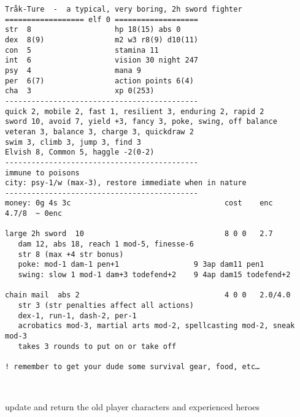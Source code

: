\small \begin{verbatim}
Tråk-Ture  -  a typical, very boring, 2h sword fighter
================== elf 0 ===================
str  8                   hp 18(15) abs 0
dex  8(9)                m2 w3 r8(9) d10(11)
con  5                   stamina 11
int  6                   vision 30 night 247
psy  4                   mana 9
per  6(7)                action points 6(4)
cha  3                   xp 0(253)
--------------------------------------------
quick 2, mobile 2, fast 1, resilient 3, enduring 2, rapid 2
sword 10, avoid 7, yield +3, fancy 3, poke, swing, off balance
veteran 3, balance 3, charge 3, quickdraw 2
swim 3, climb 3, jump 3, find 3
Elvish 8, Common 5, haggle -2(0-2)
--------------------------------------------
immune to poisons
city: psy-1/w (max-3), restore immediate when in nature
--------------------------------------------
money: 0g 4s 3c                                   cost    enc      4.7/8  ~ 0enc

large 2h sword  10                                8 0 0   2.7
   dam 12, abs 18, reach 1 mod-5, finesse-6
   str 8 (max +4 str bonus)
   poke: mod-1 dam-1 pen+1                 9 3ap dam11 pen1
   swing: slow 1 mod-1 dam+3 todefend+2    9 4ap dam15 todefend+2

chain mail  abs 2                                 4 0 0   2.0/4.0
   str 3 (str penalties affect all actions)
   dex-1, run-1, dash-2, per-1
   acrobatics mod-3, martial arts mod-2, spellcasting mod-2, sneak mod-3
   takes 3 rounds to put on or take off

! remember to get your dude some survival gear, food, etc…
\end{verbatim} \normalsize






\

\vfill


\todo update and return the old player characters and experienced heroes





